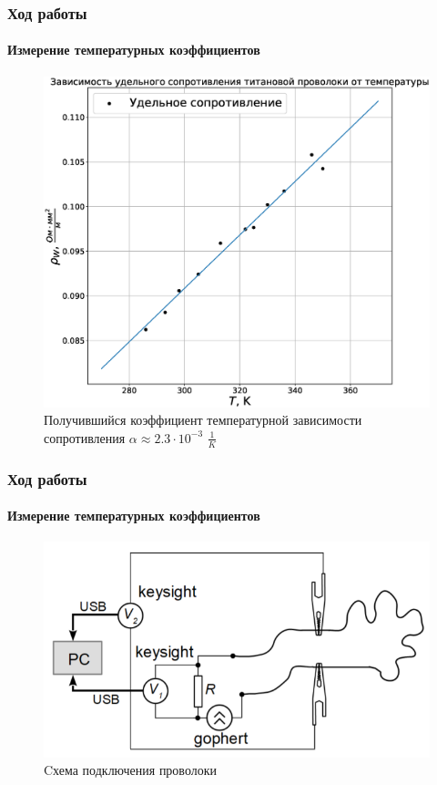 \documentclass[8pt,pdf,hyperref={unicode}]{beamer}
\begin{document}
\begin{frame}
	\frametitle{Ход работы}
	\framesubtitle{Измерение температурных коэффициентов}
	\begin{center}
		\begin{figure}[h!]
			\centering
			\includegraphics[width=.55\linewidth]{Lab3_4.eps}
			\caption{Получившийся коэффициент температурной зависимости сопротивления $\alpha \approx 2.3 \cdot 10^{-3}$ $\frac{1}{K}$}
			\label{fig4}
		\end{figure}				
	\end{center}
\end{frame}
\begin{frame}
	\frametitle{Ход работы}
	\framesubtitle{Измерение температурных коэффициентов}
	\begin{center}
		\begin{figure}[h!]
			\centering
			\includegraphics[width=.6\linewidth]{Lab3_5.png}
			\caption{Cхема подключения проволоки}
			\label{fig5}
		\end{figure}
	\end{center}
\end{frame}
\end{document}
